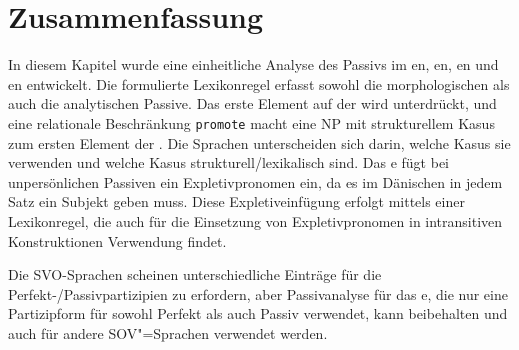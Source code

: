 \section{Zusammenfassung}

In diesem Kapitel wurde eine einheitliche Analyse des Passivs im en,
en, en und en entwickelt. Die formulierte Lexikonregel erfasst sowohl die morphologischen als auch die
analytischen Passive. Das erste Element auf der \argstl wird unterdrückt, und eine relationale Beschränkung
\texttt{promote} macht eine NP mit strukturellem Kasus zum ersten Element der \argstl. Die Sprachen unterscheiden sich darin, welche Kasus sie verwenden und
welche Kasus strukturell/lexikalisch sind. Das e fügt bei unpersönlichen Passiven ein Expletivpronomen ein, da es
im Dänischen in jedem Satz ein Subjekt geben muss. Diese Expletiveinfügung erfolgt mittels einer
Lexikonregel, die auch für die Einsetzung von Expletivpronomen in intransitiven Konstruktionen
Verwendung findet.

Die SVO-Sprachen scheinen unterschiedliche Einträge für die Perfekt-/Passivpartizipien zu erfordern,
aber  Passivanalyse für das e, die nur eine Partizipform für sowohl
Perfekt als auch Passiv verwendet, kann beibehalten und auch für andere SOV"=Sprachen verwendet werden.


